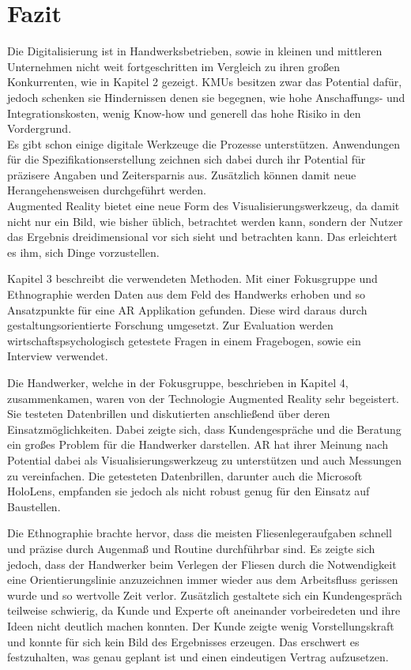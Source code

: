 \chapter{Fazit}

Die Digitalisierung ist in Handwerksbetrieben, sowie in kleinen und mittleren Unternehmen nicht weit fortgeschritten im Vergleich zu ihren großen Konkurrenten, wie in Kapitel 2 gezeigt. KMUs besitzen zwar das Potential dafür, jedoch schenken sie Hindernissen denen sie begegnen, wie hohe Anschaffungs- und Integrationskosten, wenig Know-how und generell das hohe Risiko in den Vordergrund. \\
Es gibt schon einige digitale Werkzeuge die Prozesse unterstützen. Anwendungen für die Spezifikationserstellung zeichnen sich dabei durch ihr Potential für präzisere Angaben und Zeitersparnis aus. Zusätzlich können damit neue Herangehensweisen durchgeführt werden. \\
Augmented Reality bietet eine neue Form des Visualisierungswerkzeug, da damit nicht nur ein Bild, wie bisher üblich, betrachtet werden kann, sondern der Nutzer das Ergebnis dreidimensional vor sich sieht und betrachten kann. Das erleichtert es ihm, sich Dinge vorzustellen.

Kapitel 3 beschreibt die verwendeten Methoden. Mit einer Fokusgruppe und Ethnographie werden Daten aus dem Feld des Handwerks erhoben und so Ansatzpunkte für eine AR Applikation gefunden. Diese wird daraus durch gestaltungsorientierte Forschung umgesetzt. Zur Evaluation werden wirtschaftspsychologisch getestete Fragen in einem Fragebogen, sowie ein Interview verwendet.

Die Handwerker, welche in der Fokusgruppe, beschrieben in Kapitel 4, zusammenkamen, waren von der Technologie Augmented Reality sehr begeistert. Sie testeten Datenbrillen und diskutierten anschließend über deren Einsatzmöglichkeiten. Dabei zeigte sich, dass Kundengespräche und die Beratung ein großes Problem für die Handwerker darstellen. AR hat ihrer Meinung nach Potential dabei als Visualisierungswerkzeug zu unterstützen und auch Messungen zu vereinfachen. Die getesteten Datenbrillen, darunter auch die Microsoft HoloLens, empfanden sie jedoch als nicht robust genug für den Einsatz auf Baustellen.

Die Ethnographie brachte hervor, dass die meisten Fliesenlegeraufgaben schnell und präzise durch Augenmaß und Routine durchführbar sind. Es zeigte sich jedoch, dass der Handwerker beim Verlegen der Fliesen durch die Notwendigkeit eine Orientierungslinie anzuzeichnen immer wieder aus dem Arbeitsfluss gerissen wurde und so wertvolle Zeit verlor. Zusätzlich gestaltete sich ein Kundengespräch teilweise schwierig, da Kunde und Experte oft aneinander vorbeiredeten und ihre Ideen nicht deutlich machen konnten. Der Kunde zeigte wenig Vorstellungskraft und konnte für sich kein Bild des Ergebnisses erzeugen. Das erschwert es festzuhalten, was genau geplant ist und einen eindeutigen Vertrag aufzusetzen.

